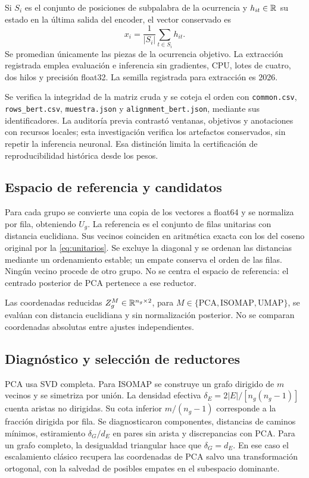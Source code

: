 Si $S_i$ es el conjunto de posiciones de subpalabra de la ocurrencia y $h_{it}\in\R^{\Num{d}}$ su estado en la última salida del encoder, el vector conservado es
\begin{equation}
 x_i=\frac{1}{|S_i|}\sum_{t\in S_i}h_{it}.
\end{equation}
Se promedian únicamente las piezas de la ocurrencia objetivo. La extracción registrada emplea evaluación e inferencia sin gradientes, CPU, lotes de cuatro, dos hilos y precisión float32. La semilla registrada para extracción es 2026.

Se verifica la integridad de la matriz cruda y se coteja el orden con \texttt{common.csv}, \texttt{rows\_bert.csv}, \texttt{muestra.json} y \texttt{alignment\_bert.json}, mediante sus identificadores. La auditoría previa contrastó ventanas, objetivos y anotaciones con recursos locales; esta investigación verifica los artefactos conservados, sin repetir la inferencia neuronal. Esa distinción limita la certificación de reproducibilidad histórica desde los pesos.

\subsection{Espacio de referencia y candidatos}
Para cada grupo se convierte una copia de los vectores a float64 y se normaliza por fila, obteniendo $U_g$. La referencia es el conjunto de filas unitarias con distancia euclidiana. Sus vecinos coinciden en aritmética exacta con los del coseno original por la \cref{eq:unitarios}. Se excluye la diagonal y se ordenan las distancias mediante un ordenamiento estable; un empate conserva el orden de las filas. Ningún vecino procede de otro grupo. No se centra el espacio de referencia: el centrado posterior de PCA pertenece a ese reductor.

Las coordenadas reducidas $Z_g^{M}\in\mathbb{R}^{n_g\times2}$, para $M\in\{\mathrm{PCA},\mathrm{ISOMAP},\mathrm{UMAP}\}$, se evalúan con distancia euclidiana y sin normalización posterior. No se comparan coordenadas absolutas entre ajustes independientes.

\subsection{Diagnóstico y selección de reductores}\label{sec:seleccion}
PCA usa SVD completa. Para ISOMAP se construye un grafo dirigido de $m$ vecinos y se simetriza por unión. La densidad efectiva $\delta_E=2|E|/[n_g(n_g-1)]$ cuenta aristas no dirigidas. Su cota inferior $m/(n_g-1)$ corresponde a la fracción dirigida por fila. Se diagnosticaron componentes, distancias de caminos mínimos, estiramiento $\delta_G/d_E$ en pares sin arista y discrepancias con PCA. Para un grafo completo, la desigualdad triangular hace que $\delta_G=d_E$. En ese caso el escalamiento clásico recupera las coordenadas de PCA salvo una transformación ortogonal, con la salvedad de posibles empates en el subespacio dominante.

